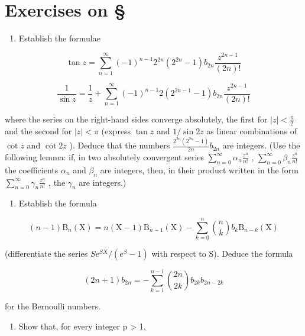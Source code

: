 \section*{Exercises on \S{}}
{}

\begin{enumerate}
\def\labelenumi{\arabic{enumi})}
\tightlist
\item
  Establish the formulae
\end{enumerate}

\[
\tan z = \sum_ {n = 1} ^ {\infty} (- 1) ^ {n - 1} 2 ^ {2 n} (2 ^ {2 n} - 1) b _ {2 n} \frac {z ^ {2 n - 1}}{(2 n) !}
\]

\[
\frac {1}{\sin z} = \frac {1}{z} + \sum_ {n = 1} ^ {\infty} (- 1) ^ {n - 1} 2 (2 ^ {2 n - 1} - 1) b _ {2 n} \frac {z ^ {2 n - 1}}{(2 n) !}
\]

where the series on the right-hand sides converge absolutely, the first for \(|z| < \frac{\pi}{2}\) and the second for \(|z| < \pi\) (express \(\tan z\) and \(1/\sin 2z\) as linear combinations of \(\cot z\) and \(\cot 2z\) ). Deduce that the numbers \(\frac{2^{2n}(2^{2n}-1)}{2n} b_{2n}\) are integers. (Use the following lemma: if, in two absolutely convergent series \(\sum_{n=0}^{\infty} \alpha_n \frac{z^n}{n!}\) , \(\sum_{n=0}^{\infty} \beta_n \frac{z^n}{n!}\) the coefficients \(\alpha_n\) and \(\beta_n\) are integers, then, in their product written in the form \(\sum_{n=0}^{\infty} \gamma_n \frac{z^n}{n!}\) , the \(\gamma_n\) are integers.)

\begin{enumerate}
\def\labelenumi{\arabic{enumi})}
\setcounter{enumi}{1}
\tightlist
\item
  Establish the formula
\end{enumerate}

\[
(n - 1) \mathrm{B} _ {n} (\mathrm{X}) = n (\mathrm{X} - 1) \mathrm{B} _ {n - 1} (\mathrm{X}) - \sum_ {k = 0} ^ {n} \binom {n} {k} b _ {k}   \mathrm{B} _ {n - k} (\mathrm{X})
\]

(differentiate the series \(Se^{SX}/(e^{S}-1)\) with respect to S). Deduce the formula

\[
(2 n + 1) b _ {2 n} = - \sum_ {k = 1} ^ {n - 1} \binom {2 n} {2 k} b _ {2 k}   b _ {2 n - 2 k}
\]

for the Bernoulli numbers.

\begin{enumerate}
\def\labelenumi{\arabic{enumi})}
\setcounter{enumi}{2}
\tightlist
\item
  Show that, for every integer p \textgreater{} 1,
\end{enumerate}

